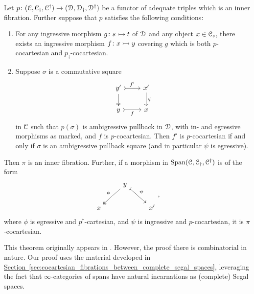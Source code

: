 \documentclass[main.tex]{subfiles}
\begin{document}
\begin{theorem}
  \label{thm:main}
  Let $p\colon (\mathcal{C}, \mathcal{C}_{\dagger}, \mathcal{C}^{\dagger}) \to (\mathcal{D}, \mathcal{D}_{\dagger}, \mathcal{D}^{\dagger})$ be a functor of adequate triples which is an inner fibration. Further suppose that $p$ satisfies the following conditions:
  \begin{enumerate}
    \item For any ingressive morphism $g\colon s \rightarrowtail t$ of $\mathcal{D}$ and any object $x \in \mathcal{C}_{s}$, there exists an ingressive morphism $f\colon x \rightarrowtail y$ covering $g$ which is both $p$-cocartesian and $p_{\dagger}$-cocartesian.

    \item Suppose $\sigma$ is a commutative square
      \begin{equation*}
        \begin{tikzcd}
          y'
          \arrow[r, rightarrowtail, "f'"]
          \arrow[d, two heads]
          & x'
          \arrow[d, "\psi"]
          \\
          y
          \arrow[r, rightarrowtail, swap, "f"]
          & x
        \end{tikzcd}
      \end{equation*}
      in $\mathcal{C}$ such that $p(\sigma)$ is ambigressive pullback in $\mathcal{D}$, with in- and egressive morphisms as marked, and $f$ is $p$-cocartesian. Then $f'$ is $p$-cocartesian if and only if $\sigma$ is an ambigressive pullback square (and in particular $\psi$ is egressive).
  \end{enumerate}

  Then $\pi$ is an inner fibration. Further, if a morphism in $\mathrm{Span}(\mathcal{C}, \mathcal{C}_{\dagger}, \mathcal{C}^{\dagger})$ is of the form
  \begin{equation*}
    \begin{tikzcd}
      & y
      \arrow[dl, two heads, swap, "\phi"]
      \arrow[dr, rightarrowtail, "\psi"]
      \\
      x
      && x'
    \end{tikzcd},
  \end{equation*}
  where $\phi$ is egressive and $p^{\dagger}$-cartesian, and $\psi$ is ingressive and $p$-cocartesian, it is $\pi$-cocartesian.%
\end{theorem}

This theorem originally appears in \cite{spectralmackeyfunctors1}. However, the proof there is combinatorial in nature. Our proof uses the material developed in \hyperref[sec:cocartesian_fibrations_between_complete_segal_spaces]{Section~\ref*{sec:cocartesian_fibrations_between_complete_segal_spaces}}, leveraging the fact that $\infty$-categories of spans have natural incarnations as (complete) Segal spaces.
\end{document}
